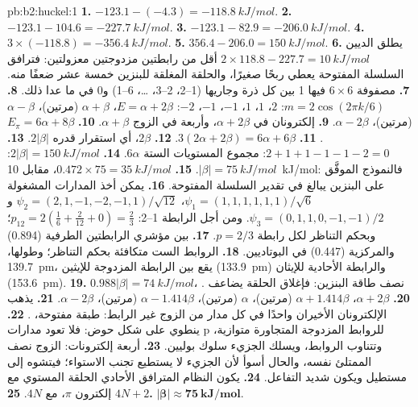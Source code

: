\begin{solution}{pb:b2:huckel:1}
\textbf{1.} $-123.1 - (-4.3) = \qty{-118.8}{kJ/mol}$.
\textbf{2.} $-123.1 - 104.6 = \qty{-227.7}{kJ/mol}$.
\textbf{3.} $-123.1 - 82.9 = \qty{-206.0}{kJ/mol}$.
\textbf{4.} $3 \times (-118.8) = \qty{-356.4}{kJ/mol}$.
\textbf{5.} $356.4 - 206.0 = \qty{150}{kJ/mol}$.
\textbf{6.} يطلق الديين $2 \times 118.8 - 227.7 = \qty{10}{kJ/mol}$ أقل من رابطتين مزدوجتين
معزولتين: فترافق السلسلة المفتوحة يعطي ربحًا صغيرًا، والحلقة المغلقة
للبنزين خمسة عشر ضعفًا منه.
\textbf{7.} مصفوفة $6 \times 6$ فيها 1 بين كل ذرة وجاريها (1--2، 2--3،
\dots، 6--1) و0 في ما عدا ذلك.
\textbf{8.} $m = 2\cos(2\pi k/6)$: $2$، $1$، $1$، $-1$، $-1$، $-2$: $E = \alpha + 2\beta$، $\alpha + \beta$ (مرتين)،
$\alpha - \beta$ (مرتين)، $\alpha - 2\beta$.
\textbf{9.} إلكترونان في $\alpha + 2\beta$، وأربعة في الزوج $\alpha + \beta$.
\textbf{10.} $E_\pi = 6\alpha + 8\beta$.
\textbf{11.} $3(2\alpha + 2\beta) = 6\alpha + 6\beta$.
\textbf{12.} $2\beta$، أي استقرار قدره $2|\beta|$.
\textbf{13.} $2 + 1 + 1 - 1 - 1 - 2 = 0$: مجموع المستويات الستة $6\alpha$.
\textbf{14.} $2|\beta| = \qty{150}{kJ/mol}$: $|\beta| = \qty{75}{kJ/mol}$.
\textbf{15.} $0.472 \times 75 = \qty{35}{kJ/mol}$، مقابل \qty{10}{kJ/mol}: فالنموذج الموفَّق
على البنزين يبالغ في تقدير السلسلة المفتوحة.
\textbf{16.} يمكن أخذ المدارات المشغولة $\psi_1 = (1, 1, 1, 1, 1, 1)/\sqrt6$،
$\psi_2 = (2, 1, -1, -2, -1, 1)/\sqrt{12}$ و$\psi_3 = (0, 1, 1, 0, -1, -1)/2$. ومن أجل الرابطة
1--2: $p_{12} = 2(\frac16 + \frac{2}{12} + 0) = \frac23$؛ وبحكم التناظر لكل رابطة $p = 2/3$.
\textbf{17.} بين مؤشري الرابطتين الطرفية (0.894) والمركزية (0.447) في البوتاديين.
\textbf{18.} الروابط الست متكافئة بحكم التناظر؛ وطولها، \qty{139.7}{pm}، يقع
بين الرابطة المزدوجة للإيثين (\qty{133.9}{pm}) والرابطة الأحادية للإيثان
(\qty{153.6}{pm}).
\textbf{19.} $0.988|\beta| = \qty{74}{kJ/mol}$، نصف طاقة البنزين: فإغلاق الحلقة يضاعف
.
\textbf{20.} $\alpha + 2\beta$، $\alpha + 1.414\beta$ (مرتين)، $\alpha$ (مرتين)، $\alpha - 1.414\beta$ (مرتين)،
$\alpha - 2\beta$.
\textbf{21.} يذهب الإلكترونان الأخيران واحدًا في كل مدار من الزوج غير الرابط: طبقة
مفتوحة، .
\textbf{22.} ينطوي على شكل حوض: فلا تعود مدارات p للروابط المزدوجة المتجاورة
متوازية، وتتناوب الروابط، ويسلك الجزيء سلوك بوليين.
\textbf{23.} أربعة إلكترونات: الزوج نصف الممتلئ نفسه، والحال أسوأ لأن الجزيء لا يستطيع
تجنب الاستواء؛ فيتشوه إلى مستطيل ويكون شديد التفاعل.
\textbf{24.} يكون النظام المترافق الأحادي الحلقة المستوي  مع $4N + 2$ إلكترون $\pi$،
 مع $4N$.
\textbf{25.} $\boldsymbol{|\beta| \approx \qty{75}{kJ/mol}}$.
\end{solution}
